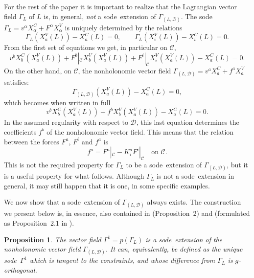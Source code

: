 \documentclass[11pt]{article}
\newtheorem{prop}{Proposition}
\def\sode{{\sc sode}}
\def\D{{\mathcal D}}
\def\C{{\mathcal C}}
\def\GLD{{\Gamma_{(L,\mathcal{D})}}}
\begin{document}
For the rest of the paper it is important to realize that the Lagrangian vector field $\Gamma_L$ of $L$ is, {in general}, {\em not} a \sode\ extension of $\Gamma_{(L,\mathcal{D})}$. The \sode\ $\Gamma_L =v^\alpha X_\alpha^C+F^\alpha X_\alpha^V$ is uniquely determined by the relations
$${\Gamma_{L}\left(X_a^V(L)\right)-X_a^C(L)=0,\qquad \Gamma_{L}\left(X_i^V(L)\right)-X_i^C(L)=0.}
$$
From the first set of equations we get, in particular  on $\C$,
$$v^bX_b^C (X_a^V(L))+F^b|_\mathcal{C} X_b^V (X_a^V(L))+ F^i|_\mathcal{C}X_i^V (X_a^V(L))-X_a^C(L)=0. 
$$
On the other hand, on $\C$, the nonholonomic vector field $\Gamma_{(L, \mathcal{D})}= v^aX_a^C+f^aX_a^V$ satisfies:
$$
\Gamma_{(L, \mathcal{D})}\left(X_a^V(L)\right)-X_a^C(L)=0,
$$
which becomes when written in full
$$
v^bX_b^C (X_a^V(L))+ f^b X_b^V (X_a^V(L))-X_a^C(L)=0.
$$
In the assumed regularity with respect to $\D$, this last equation determines the coefficients $f^b$ of the nonholonomic vector field. This means that the relation between the forces $F^a$, $F^i$ and $f^a$ is 
\[
f^a= F^a|_\C-K^a_i F^i|_\C \quad \text {on } \mathcal{C}.
\]
This is not the required property for $\Gamma_L$ to be a \sode\ extension of $\GLD$, but it is a useful property for what follows. {Although $\Gamma_L$ is not a \sode\ extension in general, it may still happen that it is one, in some specific examples.}




We now show that a \sode\ extension of $\GLD$ always exists.
The construction we present below is, in essence, also contained in  \cite{Cartan} (Proposition~2) and \cite{deL} (formulated as Proposition~2.1 in \cite{firstnonholexp}).  
 
\begin{prop} \label{prop:1} The vector field $\Gamma^1 =p(\Gamma_L)$ is a \sode\ extension of the nonholonomic vector field $\Gamma_{(L,\mathcal{D})}$. It can, equivalently, be defined as the unique \sode\ $\Gamma^1$ which is tangent to the constraints, and whose difference from $\Gamma_L$ is $g$-orthogonal. 
\end{prop}
\end{document}
